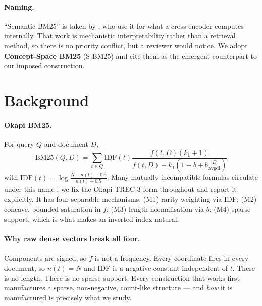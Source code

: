 \documentclass[11pt]{article}
\newcommand{\idf}{\mathrm{IDF}}
\begin{document}
\paragraph{Naming.} ``Semantic BM25'' is taken by \citet{lu2025pathway}, who use it for what a cross-encoder computes internally. That work is mechanistic interpretability rather than a retrieval method, so there is no priority conflict, but a reviewer would notice. We adopt \textbf{Concept-Space BM25} (S-BM25) and cite them as the emergent counterpart to our imposed construction.

\section{Background}

\paragraph{Okapi BM25.} For query $Q$ and document $D$,
\begin{equation}
\mathrm{BM25}(Q,D)\!=\!\!\sum_{t\in Q}\!\idf(t)\frac{f(t,D)(k_1{+}1)}{f(t,D)+k_1\!\left(1-b+b\frac{|D|}{\mathrm{avgdl}}\right)}
\label{eq:bm25}
\end{equation}
with $\idf(t)=\log\frac{N-n(t)+0.5}{n(t)+0.5}$. Many mutually incompatible formulas circulate under this name \citep{kamphuis2020which}; we fix the Okapi TREC-3 form \citep{robertson1995okapi} throughout and report it explicitly. It has four separable mechanisms: (M1) rarity weighting via IDF; (M2) concave, bounded saturation in $f$; (M3) length normalisation via $b$; (M4) sparse support, which is what makes an inverted index natural.

\paragraph{Why raw dense vectors break all four.} Components are signed, so $f$ is not a frequency. Every coordinate fires in every document, so $n(t)=N$ and IDF is a negative constant independent of $t$. There is no length. There is no sparse support. Every construction that works first manufactures a sparse, non-negative, count-like structure --- and \emph{how} it is manufactured is precisely what we study.
\end{document}

